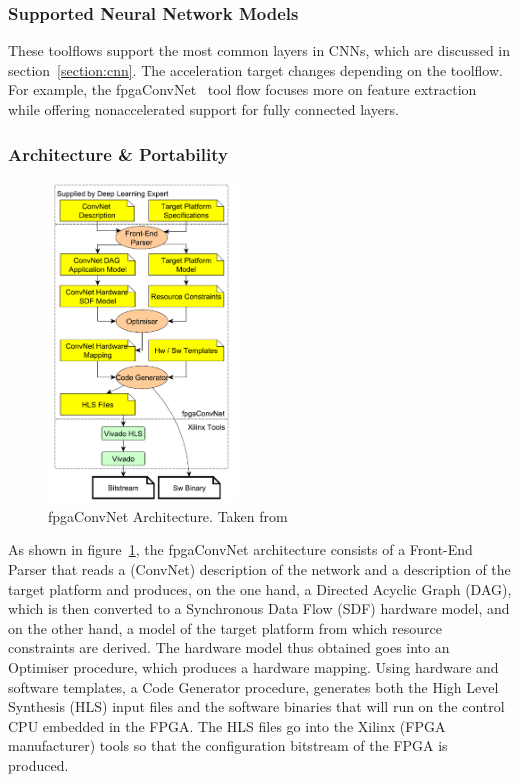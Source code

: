     \subsubsection{Supported Neural Network Models}

    These toolflows support the most common layers in CNNs, which are discussed in
    section~\ref{section:cnn}. The acceleration target changes depending on the
    toolflow.  For example, the fpgaConvNet~\cite{fpgaconvnet} tool flow focuses more
    on feature extraction while offering nonaccelerated support for fully connected
    layers.

    \subsubsection{Architecture \& Portability}

    \begin{figure}[!htbp]
        \centering
        \includegraphics[width=0.45\textwidth]{Figures/fpgaconvnet.png}
        \caption{fpgaConvNet Architecture. Taken from~\cite{fpgaconvnet}}
        \label{figure:fpgaconvnet}
    \end{figure}

    As shown in figure~\ref{figure:fpgaconvnet}, the fpgaConvNet architecture
    consists of a Front-End Parser that reads a (ConvNet) description of the network
    and a description of the target platform and produces, on the one hand, a
    Directed Acyclic Graph (DAG), which is then converted to a Synchronous Data Flow
    (SDF) hardware model, and on the other hand, a model of the target platform from
    which resource constraints are derived. The hardware model thus obtained goes
    into an Optimiser procedure, which produces a hardware mapping. Using hardware
    and software templates, a Code Generator procedure, generates both the High
    Level Synthesis (HLS) input files and the software binaries that will run on the
    control CPU embedded in the FPGA. The HLS files go into the Xilinx (FPGA
    manufacturer) tools so that the configuration bitstream of the FPGA is produced.



